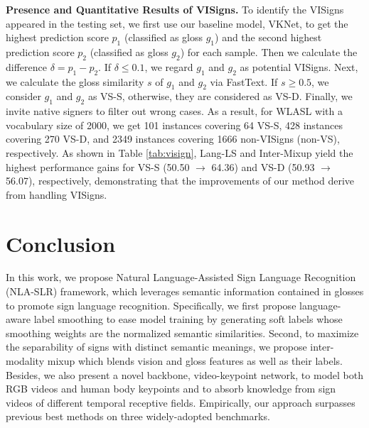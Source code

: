\documentclass[10pt,twocolumn,letterpaper]{article}
\begin{document}
\begin{table}[t]
\centering
{}
\vspace{-3mm}
\caption{Quantitative results over VISigns. We report top-1 accuracy on WLASL2000. 
(VS-S/D: VISigns with similar/distinct semantic meanings.)
}
\label{tab:visign}
\vspace{-5mm}
\end{table}


\noindent \textbf{Presence and Quantitative Results of VISigns.}
To identify the VISigns appeared in the testing set, we first use our baseline model, VKNet, to get the highest prediction score $p_1$ (classified as gloss $g_1$) and the second highest prediction score $p_2$ (classified as gloss $g_2$) for each sample. Then we calculate the difference $\delta = p_1 - p_2$. If $\delta \leq 0.1$, we regard $g_1$ and $g_2$ as potential VISigns. Next, we calculate the gloss similarity $s$ of $g_1$ and $g_2$ via FastText. If $s\ge0.5$, we consider $g_1$ and $g_2$ as VS-S, otherwise, they are considered as VS-D. Finally, we invite native signers to filter out wrong cases. As a result, for WLASL with a vocabulary size of 2000, we get 101 instances covering 64 VS-S, 428 instances covering 270 VS-D, and 2349 instances covering 1666 non-VISigns (non-VS), respectively. As shown in Table \ref{tab:visign}, Lang-LS and Inter-Mixup yield the highest performance gains for VS-S (50.50 $\rightarrow$ 64.36) and VS-D (50.93 $\rightarrow$ 56.07), respectively, demonstrating that the improvements of our method derive from handling VISigns. \vspace{-2mm}
\section{Conclusion}
\vspace{-1mm}
In this work, we propose Natural Language-Assisted Sign Language Recognition (NLA-SLR) framework, which leverages semantic information contained in glosses to promote sign language recognition.
Specifically, we first propose language-aware label smoothing to ease model training by generating soft labels whose smoothing
weights are the normalized semantic similarities.
Second, to maximize the separability of signs with distinct semantic meanings, we propose inter-modality mixup which blends vision and gloss features as well as their labels.
Besides, we also present a novel backbone, video-keypoint network, to model both RGB videos and human body keypoints and to absorb knowledge from sign videos of different temporal receptive fields.
Empirically, our approach surpasses previous best methods on three widely-adopted benchmarks.
\end{document}
